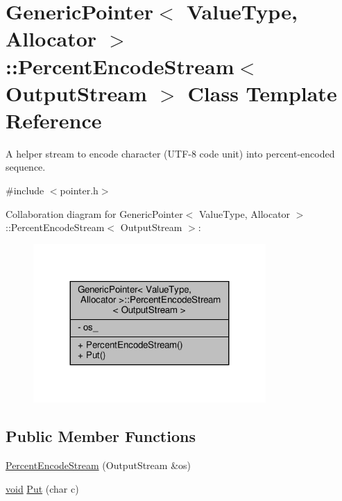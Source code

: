 \hypertarget{classGenericPointer_1_1PercentEncodeStream}{}\section{Generic\+Pointer$<$ Value\+Type, Allocator $>$\+:\+:Percent\+Encode\+Stream$<$ Output\+Stream $>$ Class Template Reference}
\label{classGenericPointer_1_1PercentEncodeStream}


A helper stream to encode character (U\+T\+F-\/8 code unit) into percent-\/encoded sequence.  




{\ttfamily \#include $<$pointer.\+h$>$}



Collaboration diagram for Generic\+Pointer$<$ Value\+Type, Allocator $>$\+:\+:Percent\+Encode\+Stream$<$ Output\+Stream $>$\+:
\nopagebreak
\begin{figure}[H]
\begin{center}
\leavevmode
\includegraphics[width=251pt]{classGenericPointer_1_1PercentEncodeStream__coll__graph}
\end{center}
\end{figure}
\subsection*{Public Member Functions}
\begin{DoxyCompactItemize}
\item 
\hyperlink{classGenericPointer_1_1PercentEncodeStream_a8e16af18669e49d0ab528ba0066475d2}{Percent\+Encode\+Stream} (Output\+Stream \&os)
\item 
\hyperlink{imgui__impl__opengl3__loader_8h_ac668e7cffd9e2e9cfee428b9b2f34fa7}{void} \hyperlink{classGenericPointer_1_1PercentEncodeStream_ab932ed9ab00c9e0672755133fc8d8c11}{Put} (char c)
\end{DoxyCompactItemize}
